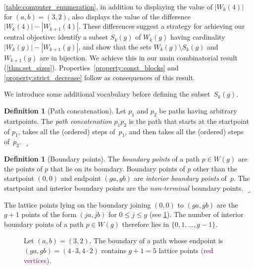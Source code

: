 \documentclass[11pt]{article}
\newcommand{\lrcornerqed}[0]{}
\renewcommand{\lrcornerqed}[0]{\hfill $\lrcorner$} %
\theoremstyle{definition} %
\newtheorem{definition}[thm]{Definition}
\numberwithin{equation}{section}
\begin{document}
\cref{table:computer_enumeration}, in addition to displaying the value of $|W_k(4)|$ for $(a,b)=(3,2)$, also displays the value of the difference $|W_k(4)|-|W_{k+1}(4)|$. 
These differences suggest a strategy for achieving our central objective: identify a subset $S_k(g)$ of $W_k(g)$ having cardinality $|W_k(g)|-|W_{k+1}(g)|$, and show that the sets $W_k(g) \setminus S_k(g)$ and $W_{k+1}(g)$ are in bijection. We achieve this in our main combinatorial result (\cref{thm:set_sizes}).
Properties~\ref{property:const_blocks} and \ref{property:strict_decrease} 
follow as consequences of this result.

We introduce some additional vocabulary before defining the subset~$S_k(g)$.

\begin{definition}[Path concatenation]\label{def:concatenation}
    Let $p_1$ and $p_2$ be paths having  arbitrary startpoints. The \textit{path concatenation} $p_1p_2$ is the path that starts at the startpoint of $p_1$, takes all the (ordered) steps of~$p_1$, and then takes all the (ordered) steps of~$p_2$. \lrcornerqed
\end{definition}


\begin{definition}[Boundary points]\label{def:BP}
    The \textit{boundary points} of a path $p \in W(g)$ are the points of $p$ that lie on its boundary. Boundary points of $p$ other than the startpoint $(0,0)$ and endpoint $(ga,gb)$ are \textit{interior boundary points} of~$p$.   The startpoint and interior boundary points are the \textit{non-terminal} boundary points. \lrcornerqed
\end{definition}
    
The lattice points lying on the boundary joining $(0,0)$ to $(ga,gb)$ are the $g+1$ points of the form $(ja,jb)$ for $0 \le j \le g$ (see \cref{fig:boundary_points}).
The number of interior boundary points of a path $p \in W(g)$ therefore lies 
in $\{0,1,\dots,g-1\}$. 

\begin{figure}
    \centering
    \caption{Let $(a,b) = (3,2)$. The boundary of a path whose endpoint is $(ga,gb) = (4 \cdot 3, 4\cdot 2)$ contains $g+1 = 5$ lattice points \textcolor{purple}{(red vertices)}.}
    \label{fig:boundary_points}
\end{figure}
\end{document}
